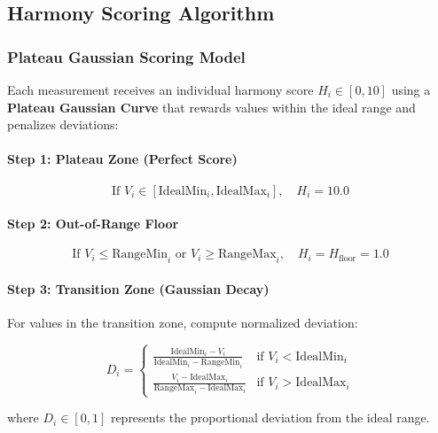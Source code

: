 \subsection{Harmony Scoring Algorithm}

\subsubsection{Plateau Gaussian Scoring Model}

Each measurement receives an individual harmony score $H_i \in [0, 10]$ using a \textbf{Plateau Gaussian Curve} that rewards values within the ideal range and penalizes deviations:

\paragraph{Step 1: Plateau Zone (Perfect Score)}
\begin{equation}
\text{If } V_i \in [\text{IdealMin}_i, \text{IdealMax}_i], \quad H_i = 10.0
\end{equation}

\paragraph{Step 2: Out-of-Range Floor}
\begin{equation}
\text{If } V_i \leq \text{RangeMin}_i \text{ or } V_i \geq \text{RangeMax}_i, \quad H_i = H_{\text{floor}} = 1.0
\end{equation}

\paragraph{Step 3: Transition Zone (Gaussian Decay)}

For values in the transition zone, compute normalized deviation:

\begin{equation}
D_i = \begin{cases}
\frac{\text{IdealMin}_i - V_i}{\text{IdealMin}_i - \text{RangeMin}_i} & \text{if } V_i < \text{IdealMin}_i \\[10pt]
\frac{V_i - \text{IdealMax}_i}{\text{RangeMax}_i - \text{IdealMax}_i} & \text{if } V_i > \text{IdealMax}_i
\end{cases}
\end{equation}

where $D_i \in [0, 1]$ represents the proportional deviation from the ideal range.


